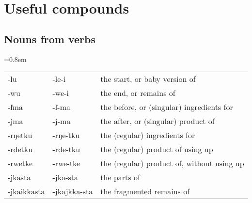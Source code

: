 \chapter{Useful compounds}
\section{Nouns from verbs}
\begin{center}
  \tabcolsep=0.8em
  \begin{tabular}{@{\hskip 0.5em}lll@{\hskip 0.5em}}
    \toprule
    -lu         & -le-i        & the start, or baby version of \\
    -wu         & -we-i        & the end, or remains of \\
    -\v{l}ma    & -\v{l}-ma    & the before, or (singular) ingredients for \\
    -jma        & -j-ma        & the after, or (singular) product of \\
    -rŋetku     & -rŋe-tku     & the (regular) ingredients for \\
    -rdetku     & -rde-tku     & the (regular) product of using up \\
    -rwetke     & -rwe-tke     & the (regular) product of, without using up \\
    -jkasta     & -jka-sta     & the parts of \\
    -jkaikkasta & -jkajkka-sta & the fragmented remains of \\
    \bottomrule
  \end{tabular}
\end{center}

